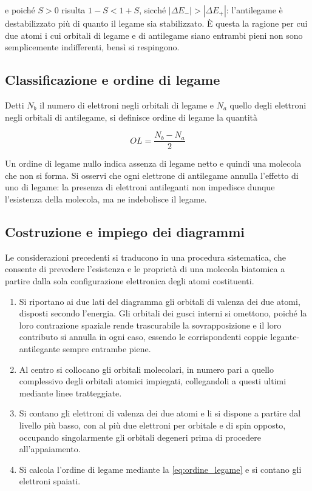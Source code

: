 e poiché $S > 0$ risulta $1-S < 1+S$, sicché $|\Delta E_-| > |\Delta E_+|$: l'antilegame è destabilizzato più di quanto il legame sia stabilizzato. È questa la ragione per cui due atomi i cui orbitali di legame e di antilegame siano entrambi pieni non sono semplicemente indifferenti, bensì si respingono.

\subsection{Classificazione e ordine di legame}

Detti $N_b$ il numero di elettroni negli orbitali di legame e $N_a$ quello degli elettroni negli orbitali di antilegame, si definisce ordine di legame la quantità

\begin{equation}
    OL = \frac{N_b - N_a}{2}
    \label{eq:ordine_legame}
\end{equation}

Un ordine di legame nullo indica assenza di legame netto e quindi una molecola che non si forma. Si osservi che ogni elettrone di antilegame annulla l'effetto di uno di legame: la presenza di elettroni antileganti non impedisce dunque l'esistenza della molecola, ma ne indebolisce il legame.

\subsection{Costruzione e impiego dei diagrammi}

Le considerazioni precedenti si traducono in una procedura sistematica, che consente di prevedere l'esistenza e le proprietà di una molecola biatomica a partire dalla sola configurazione elettronica degli atomi costituenti.

\begin{enumerate}
    \item Si riportano ai due lati del diagramma gli orbitali di valenza dei due atomi, disposti secondo l'energia. Gli orbitali dei gusci interni si omettono, poiché la loro contrazione spaziale rende trascurabile la sovrapposizione e il loro contributo si annulla in ogni caso, essendo le corrispondenti coppie legante-antilegante sempre entrambe piene.

    \item Al centro si collocano gli orbitali molecolari, in numero pari a quello complessivo degli orbitali atomici impiegati, collegandoli a questi ultimi mediante linee tratteggiate.

    \item Si contano gli elettroni di valenza dei due atomi e li si dispone a partire dal livello più basso, con al più due elettroni per orbitale e di spin opposto, occupando singolarmente gli orbitali degeneri prima di procedere all'appaiamento.

    \item Si calcola l'ordine di legame mediante la \eqref{eq:ordine_legame} e si contano gli elettroni spaiati.
\end{enumerate}

